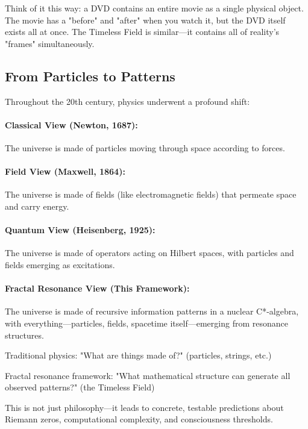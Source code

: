 Think of it this way: a DVD contains an entire movie as a single physical object. The movie has a "before" and "after" when you watch it, but the DVD itself exists all at once. The Timeless Field is similar—it contains all of reality's "frames" simultaneously.

\subsection{From Particles to Patterns}

Throughout the 20th century, physics underwent a profound shift:

\paragraph{Classical View (Newton, 1687):} The universe is made of particles moving through space according to forces.

\paragraph{Field View (Maxwell, 1864):} The universe is made of fields (like electromagnetic fields) that permeate space and carry energy.

\paragraph{Quantum View (Heisenberg, 1925):} The universe is made of operators acting on Hilbert spaces, with particles and fields emerging as excitations.

\paragraph{Fractal Resonance View (This Framework):} The universe is made of recursive information patterns in a nuclear C*-algebra, with everything—particles, fields, spacetime itself—emerging from resonance structures.

\begin{keyidea}
Traditional physics: "What are things made of?" (particles, strings, etc.)

Fractal resonance framework: "What mathematical structure can generate all observed patterns?" (the Timeless Field)

This is not just philosophy—it leads to concrete, testable predictions about Riemann zeros, computational complexity, and consciousness thresholds.
\end{keyidea}

